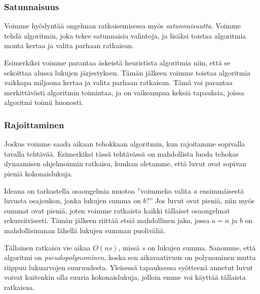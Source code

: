 \subsubsection{Satunnaisuus}


Voimme hyödyntää ongelman ratkaisemisessa myös
\emph{satunnaisuutta}.
Voimme tehdä algoritmin, joka tekee satunnaisia valintoja,
ja lisäksi toistaa algoritmia monta kertaa ja valita
parhaan ratkaisun.

Esimerkiksi voimme parantaa äskeistä heuristista algoritmia niin,
että se sekoittaa alussa lukujen järjestyksen. Tämän jälkeen voimme toistaa
algoritmia vaikkapa miljoona kertaa ja valita parhaan ratkaisun.
Tämä voi parantaa merkittävästi algoritmin toimintaa, ja on
vaikeampaa keksiä tapauksia, joissa algoritmi toimii huonosti.

\subsubsection{Rajoittaminen}


Joskus voimme saada aikaan tehokkaan algoritmin,
kun rajoitamme sopivalla tavalla tehtävää.
Esimerkiksi tässä tehtävässä on mahdollista luoda
tehokas dynaamisen ohjelmoinnin ratkaisu,
kunhan oletamme, että luvut ovat sopivan pieniä kokonaislukuja.

Ideana on tarkastella osaongelmia muotoa
''voimmeko valita $a$ ensim\-mäisestä luvusta osajoukon,
jonka lukujen summa on $b$?''
Jos luvut ovat pieniä, niin myös summat ovat pieniä,
joten voimme ratkaista kaikki tällaiset osaongelmat rekursiivisesti.
Tämän jälkeen riittää etsiä mahdollinen jako, jossa $a=n$
ja $b$ on mahdollisimman lähellä lukujen summan puoliväliä.

Tällainen ratkaisu vie aikaa $O(ns)$, missä $s$ on lukujen summa.
Sanomme, että algoritmi on \emph{pseudopolynominen},
koska sen aikavaativuus on polynominen mutta riippuu lukuarvojen suuruudesta.
Yleisessä tapauksessa syötteenä annetut luvut voivat
kuitenkin olla suuria kokonaislukuja,
jolloin emme voi käyttää tällaista ratkaisua.
